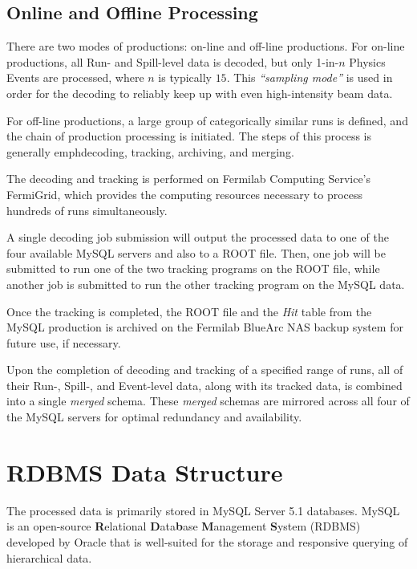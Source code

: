 
\subsection{Online and Offline Processing}

There are two modes of productions: on-line and off-line productions. For on-line productions, all Run- and Spill-level data is decoded, but only 1-in-$n$ Physics Events are processed, where $n$ is typically $15$. This \emph{``sampling mode''} is used in order for the decoding to reliably keep up with even high-intensity beam data.

For off-line productions, a large group of categorically similar runs is defined, and the chain of production processing is initiated. The steps of this process is generally emph{decoding, tracking, archiving, and merging}.

The decoding and tracking is performed on Fermilab Computing Service's FermiGrid, which provides the computing resources necessary to process hundreds of runs simultaneously.

A single decoding job submission will output the processed data to one of the four available MySQL servers and also to a ROOT file. Then, one job will be submitted to run one of the two tracking programs on the ROOT file, while another job is submitted to run the other tracking program on the MySQL data.

Once the tracking is completed, the ROOT file and the \emph{Hit} table from the MySQL production is archived on the Fermilab BlueArc NAS backup system for future use, if necessary.

Upon the completion of decoding and tracking of a specified range of runs, all of their Run-, Spill-, and Event-level data, along with its tracked data, is combined into a single \emph{merged} schema. These \emph{merged} schemas are mirrored across all four of the MySQL servers for optimal redundancy and availability.

\section{RDBMS Data Structure}

The processed data is primarily stored in MySQL Server 5.1 databases. MySQL is an open-source \textbf{R}elational \textbf{D}ata\textbf{b}ase \textbf{M}anagement \textbf{S}ystem (RDBMS) developed by Oracle that is well-suited for the storage and responsive querying of hierarchical data.

